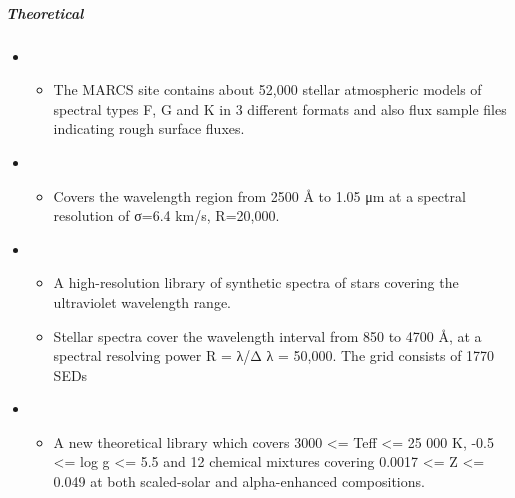 \documentclass[letterpaper,10pt,english]{sphinxmanual}
\begin{document}
\subparagraph{Theoretical}
\label{\detokenize{resource/astro/topics/stellar_and_spops:theoretical}}\begin{itemize}
\item {} 
\begin{itemize}
\item {} 
The MARCS site contains about 52,000 stellar atmospheric models of
spectral types F, G and K in 3 different formats and also flux
sample files indicating rough surface fluxes.

\end{itemize}

\item {} 
\begin{itemize}
\item {} 
Covers the wavelength region from 2500 Å to 1.05 μm at a spectral
resolution of σ=6.4 km/s, R=20,000.

\end{itemize}

\item {} 
\begin{itemize}
\item {} 
A high-resolution library of synthetic spectra of stars covering
the ultraviolet wavelength range.

\item {} 
Stellar spectra cover the wavelength interval from 850 to 4700 Å,
at a spectral resolving power R = λ/Δ λ = 50,000. The grid
consists of 1770 SEDs

\end{itemize}

\item {} 
\begin{itemize}
\item {} 
A new theoretical library which covers 3000 \textless{}= Teff \textless{}= 25 000 K,
-0.5 \textless{}= log g \textless{}= 5.5 and 12 chemical mixtures covering 0.0017 \textless{}= Z
\textless{}= 0.049 at both scaled-solar and alpha-enhanced compositions.

\end{itemize}

\end{itemize}
\end{document}
